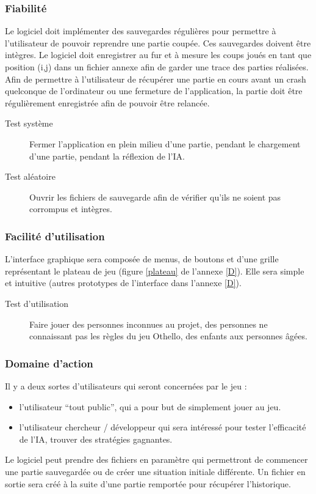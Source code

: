 \documentclass[a4paper,12pt]{article}
\begin{document}
\subsubsection{Fiabilité}

Le logiciel doit implémenter des sauvegardes régulières pour permettre à l’utilisateur de pouvoir reprendre une partie coupée. Ces sauvegardes doivent être intègres.
Le logiciel doit enregistrer au fur et à mesure les coups joués en tant que position (i,j) dans un fichier annexe afin de garder une trace des parties réalisées.
Afin de permettre à l’utilisateur de récupérer une partie en cours avant un crash quelconque de l’ordinateur ou une fermeture de l’application, la partie doit être régulièrement enregistrée afin de pouvoir être relancée.

\begin{description}
\item[Test système] Fermer l’application en plein milieu d’une partie, pendant le chargement d’une partie, pendant la réflexion de l’IA. 
\item[Test aléatoire] Ouvrir les fichiers de sauvegarde afin de vérifier qu’ils ne soient pas corrompus et intègres.
\end{description}

\subsubsection{Facilité d’utilisation}

L’interface graphique sera composée de menus, de boutons et d'une
grille représentant le plateau de jeu (figure \ref{plateau} de
l'annexe \ref{D}). Elle sera simple et intuitive
(autres prototypes de l'interface dans l'annexe \ref{D}).
 
\begin{description}
\item[Test d’utilisation] Faire jouer des personnes inconnues au projet, des personnes ne connaissant pas les règles du jeu Othello, des enfants aux personnes âgées. 
\end{description}

\subsubsection{Domaine d’action}

Il y a deux sortes d’utilisateurs qui seront concernées par le jeu :
\begin{itemize}
\item l'utilisateur ``tout public'', qui a pour but de simplement jouer au jeu.
\item l’utilisateur chercheur / développeur qui sera intéressé pour tester l’efficacité de l’IA, trouver des stratégies gagnantes.
\end{itemize}
Le logiciel peut prendre des fichiers en paramètre qui permettront de commencer une partie sauvegardée ou de créer une situation initiale différente. Un fichier en sortie sera créé à la suite d’une partie remportée pour récupérer l'historique.
\end{document}
